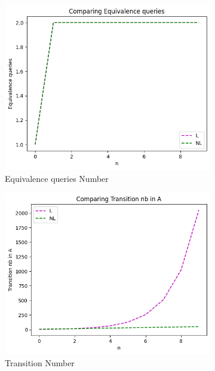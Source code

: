 \begin{figure}[!htb]
  \begin{subfigure}[b]{0.3\textwidth}
    \includegraphics[width=\textwidth]{../statistics/plots/wrostDFA/Equivalence queries.png}
    \caption{Equivalence queries Number}
    \label{fig:EquivWrostDFACompare}
  \end{subfigure}
  \begin{subfigure}[b]{0.3\textwidth}
    \includegraphics[width=\textwidth]{../statistics/plots/wrostDFA/Transition nb in A.png}
    \caption{Transition Number}
    \label{fig:TransitionWrostDFACompare}
  \end{subfigure}
  \begin{subfigure}[b]{0.3\textwidth}

\end{subfigure}
\end{figure}
